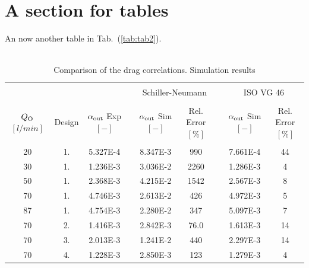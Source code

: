 \section{A section for tables}
An now another table in Tab.~(\ref{tab:tab2}). \\ \\ 
\begin{table}[t] %
  \centering
    \setlength\tabcolsep{1.5ex}
  \begin{tabular*}{\textwidth}{*{9}{c}}
    \hline \vspace{-2.5mm} \\
      & & && \multicolumn{2}{c}{ Schiller-Neumann }  && 
     \multicolumn{2}{c}{ ISO VG 46 } \\ \cline{5-6} \cline{8-9} \vspace{-2mm} \\ 
     \shortstack{$Q_{\mathrm{O}}$ \\ $[l/min]$} & Design & \shortstack{$\alpha_{\mathrm{out}}$ Exp \\ $[-]$} && \shortstack{$\alpha_{\mathrm{out}}$ Sim \\ $[-]$} & \shortstack{Rel. Error \\ $[\%]$} && \shortstack{$\alpha_{\mathrm{out}}$ Sim \\ $[-]$} & \shortstack{Rel. Error \\ $[\%]$} \vspace{1.5mm} \\
    \hline \vspace{-1.5mm} \\ 
    20 & 1. & 5.327E-4  && 8.347E-3 	& 990 	&& 7.661E-4 	& 44 \\
    30 & 1. & 1.236E-3  && 3.036E-2 	& 2260 	&& 1.286E-3 	& 4 \\
    50 & 1. & 2.368E-3  && 4.215E-2	    & 1542 	&& 2.567E-3 	& 8 \\
    70 & 1. & 4.746E-3  && 2.613E-2 	& 426 	&& 4.972E-3 	& 5 \\
    87 & 1. & 4.754E-3  && 2.280E-2 	& 347 	&& 5.097E-3 	& 7 \\
    70 & 2. & 1.416E-3  && 2.842E-3 	& 76.0 	&& 1.613E-3 	& 14 \\
    70 & 3. & 2.013E-3  && 1.241E-2 	& 440 	&& 2.297E-3 	& 14 \\
    70 & 4. & 1.228E-3  && 2.850E-3 	& 123 	&& 1.279E-3 	& 4 \\
    \hline
  \end{tabular*}
\captionsetup{justification=raggedright,singlelinecheck=false}
\caption{ Comparison of the drag correlations. Simulation results}
\label{tab:tab1}
\end{table}
